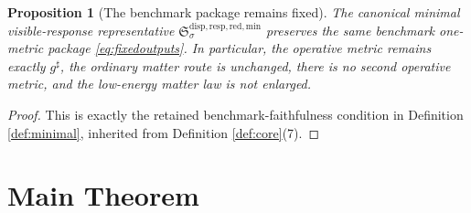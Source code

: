 \documentclass[11pt]{article}
\newcommand{\CompletedMetric}{g^{\sharp}}
\newcommand{\MinimalReducedStructure}{\mathfrak S^{\mathrm{disp,resp,red,min}}}
\newtheorem{proposition}{Proposition}
\begin{document}
\begin{proposition}[The benchmark package remains fixed]
\label{prop:benchmark}
The canonical minimal visible-response representative \(\MinimalReducedStructure_{\sigma}\) preserves the same benchmark one-metric package \eqref{eq:fixedoutputs}. In particular, the operative metric remains exactly \(\CompletedMetric\), the ordinary matter route is unchanged, there is no second operative metric, and the low-energy matter law is not enlarged.
\end{proposition}

\begin{proof}
This is exactly the retained benchmark-faithfulness condition in Definition \ref{def:minimal}, inherited from Definition \ref{def:core}(7).
\end{proof}

\section{Main Theorem}
\end{document}
